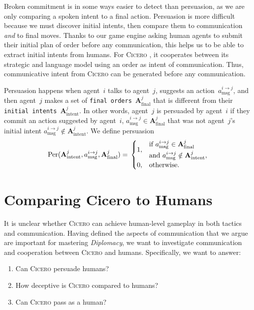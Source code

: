 \documentclass[oneside]{memoir}
\newcommand{\cicero}{\abr{Cicero} }
\newcommand{\abr}[1]{\textsc{#1}}
\begin{document}
Broken commitment is in some ways easier to detect than persuasion, as we are
only comparing a spoken intent to a final action. Persuasion is more difficult because we must discover initial
intents, then compare them to communication \emph{and} to final moves. Thanks to our game engine asking human agents to submit their initial plan of order before any communication, this helps us to be able to extract initial intents from humans. For \cicero, it cooperates between its strategic and language model using an order as intent of communication. Thus, communicative intent from \cicero can be generated before any communication. 


Persuasion happens when agent~$i$ talks to agent~$j$, suggests an
action~$a^{i\to j}_{\text{msg}}$, and then agent~$j$ makes a set of
\texttt{final orders}~$\mathbf{A}^{j}_{\text{final}}$ that is different from 
their \texttt{initial intents}~$\mathbf{A}^{j}_{\text{intent}}$. In other words, agent~$j$ is persuaded by agent~$i$ if they commit an action suggested by  agent~$i$, $a^{i\to j}_{\text{msg}} \in \mathbf{A}^{j}_{\text{final}}$ that was not agent~$j$'s initial intent $a^{i\to j}_{\text{msg}} \notin \mathbf{A}^{j}_{\text{intent}}$.
%
We define persuasion 
\begin{equation}
     \text{Per}(\mathbf{A}^{j}_{\text{intent}}, a^{i\to j}_{\text{msg}}, \mathbf{A}^{j}_{\text{final}}) = \\
    \begin{cases}
    1, & 
    \begin{aligned}[c]
    &\text{if } a^{i\to j}_{\text{msg}} \in \mathbf{A}^{j}_{\text{final}} \\
    &\text{and } a^{i\to j}_{\text{msg}} \notin \mathbf{A}^{j}_{\text{intent}},
    \end{aligned} \\
    0, & \text{otherwise.}
    \end{cases}
    \label{eq: per}
\end{equation}

\section{Comparing Cicero to Humans}
\label{sec:human_comp_games}


It is unclear whether \cicero can
achieve human-level gameplay in both tactics and
communication. Having defined the aspects of communication that we
argue are important for mastering \textit{Diplomacy}, we want to
investigate communication and cooperation between \cicero and
humans. Specifically, we want to answer:
\begin{enumerate}
    \item Can \cicero persuade humans?
    \item How deceptive is \cicero compared to humans? 
    \item Can \cicero pass as a human?
\end{enumerate}
\end{document}
